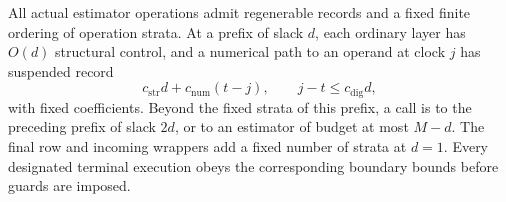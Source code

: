 \begin{lemma}\label{lem:ctrl-recipes}
All actual estimator operations admit regenerable records and a fixed
finite ordering of operation strata.  At a prefix of slack $d$, each
ordinary layer has $O(d)$ structural control, and a numerical path to an
operand at clock $j$ has suspended record
\begin{equation}\label{eq:ctrl-recipe-bound}
 c_{\mathrm{str}}d+c_{\mathrm{num}}(t-j),\qquad
 j-t\le c_{\mathrm{dig}}d,
\end{equation}
with fixed coefficients.  Beyond the fixed strata of this prefix, a
call is to the preceding prefix of slack $2d$, or to an estimator of
budget at most $M-d$.  The final row and incoming wrappers add a fixed
number of strata at $d=1$.  Every designated terminal execution obeys
the corresponding boundary bounds before guards are imposed.
\end{lemma}

